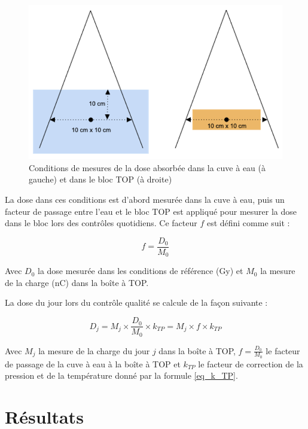 \documentclass{article}
\begin{document}
\begin{figure}[h]
  \centering
  \includegraphics[scale=0.8]{figures/conditions_ref_top.png}
  \caption{Conditions de mesures de la dose absorbée dans la cuve à eau (à gauche) et dans le bloc TOP (à droite)}
  \label{fig_top}
\end{figure}

La dose dans ces conditions est d'abord mesurée dans la cuve à eau, puis un facteur de passage entre l'eau et le bloc TOP est appliqué pour mesurer la dose dans le bloc lors des contrôles quotidiens. Ce facteur $f$ est défini comme suit :

\begin{equation}
  f = \dfrac{D_0}{M_0}
  \label{eq_facteur_top}
\end{equation}

Avec $D_0$ la dose mesurée dans les conditions de référence (Gy) et $M_0$ la mesure de la charge (nC) dans la boîte à TOP.

La dose du jour lors du contrôle qualité se calcule de la façon suivante :

\begin{equation}
  D_j = M_j \times \dfrac{D_0}{M_0} \times k_{TP} = M_j \times f \times k_{TP}
  \label{eq_top_jour}
\end{equation}

Avec $M_j$ la mesure de la charge du jour $j$ dans la boîte à TOP, $f = \frac{D_0}{M_0}$ le facteur de passage de la cuve à eau à la boîte à TOP et $k_{TP}$ le facteur de correction de la pression et de la température donné par la formule \ref*{eq_k_TP}.

\clearpage
\section{Résultats}
\end{document}
